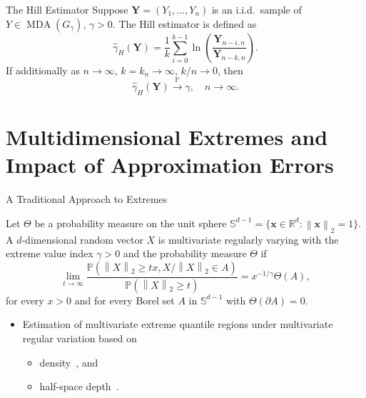 \documentclass[11pt, aspectratio=169]{beamer}
\DeclareMathOperator{\mda}{MDA}
\begin{document}

\begin{frame}{The Hill Estimator \parencite{hill1975,mason1982}}
  Suppose $\bm Y = \left(Y_1, \ldots, Y_n\right)$ is an i.i.d.\ sample of
  $Y\in\mda\left(G_\gamma\right)$, $\gamma > 0$. The Hill estimator is defined
  as
  \begin{equation*}
    \hat\gamma_H\left(\bm Y\right) = \frac{1}{k}\sum_{i = 0}^{k - 1}
    \ln\left(\frac{\bm Y_{n-i,n}}{\bm Y_{n-k,n}}\right).
  \end{equation*}
  \pause
  If additionally as $n\to\infty$, $k = k_n\to\infty$, $k/n\to 0$, then
  \begin{equation*}
    \hat\gamma_H\left(\bm Y\right)\stackrel{\mathbb{P}}{\to} \gamma,
    \quad n\to\infty.
  \end{equation*}
\end{frame}


\section{Multidimensional Extremes and Impact of Approximation Errors}

\begin{frame}{A Traditional Approach to Extremes}
  \small
  \begin{definition}
    Let $\Theta$ be a probability measure on the unit sphere $\mathbb{S}^{d-1} =
    \{\bm x\in\mathbb{R}^d : \left\|\bm x\right\|_2 = 1\}$. A $d$-dimensional
    random vector $X$ is multivariate regularly varying with the extreme value
    index $\gamma > 0$ and the probability measure $\Theta$ if
    \begin{equation*}
      \lim_{t\to\infty} \frac{\mathbb{P}\left(\left\| X \right\|_2 \geq tx,
      X/\left\|X\right\|_2\in A\right)}
      {\mathbb{P}\left(\left\|X\right\|_2\geq t\right)} = x^{-1/\gamma}
      \Theta\left(A\right),
    \end{equation*}
    for every $x > 0$ and for every Borel set $A$ in $\mathbb{S}^{d-1}$ with
    $\Theta\left(\partial A\right) = 0$.
\end{definition}
\pause
\begin{itemize}
  \item Estimation of multivariate extreme quantile regions under multivariate
  regular variation based on
  \begin{itemize}
    \item density~\parencite{cai2011}, and
    \item half-space depth~\parencite{he2016}.
  \end{itemize}
\end{itemize}
\end{frame}
\end{document}

